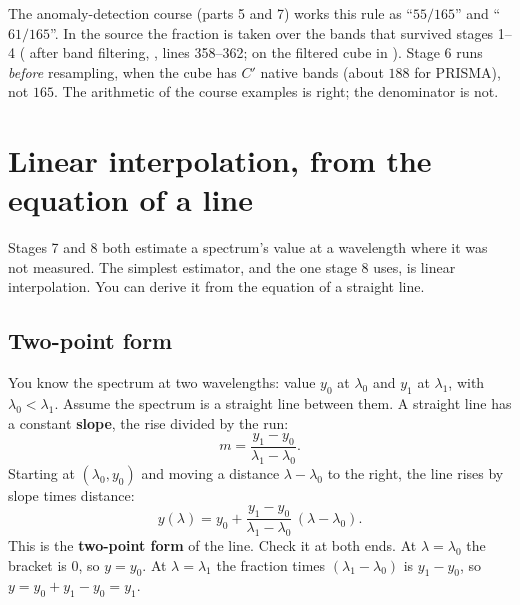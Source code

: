 \begin{sourcenote}
The anomaly-detection course (parts 5 and 7) works this rule as ``$55/165$'' and ``$61/165$''. In the
source the fraction is taken over the bands that survived stages 1--4 ( after band filtering, , lines 358--362;
 on the filtered cube in ). Stage 6 runs
\emph{before} resampling, when the cube has $C'$ native bands (about $188$ for PRISMA), not $165$.
The arithmetic of the course examples is right; the denominator is not.
\end{sourcenote}

\section{Linear interpolation, from the equation of a line}\label{sec:bandpipeline:linear}

Stages 7 and 8 both estimate a spectrum's value at a wavelength where it was not measured. The
simplest estimator, and the one stage 8 uses, is linear interpolation. You can derive it from the
equation of a straight line.

\subsection{Two-point form}

You know the spectrum at two wavelengths: value $y_0$ at $\lambda_0$ and $y_1$ at $\lambda_1$, with
$\lambda_0 < \lambda_1$. Assume the spectrum is a straight line between them. A straight line has a
constant \textbf{slope}, the rise divided by the run:
\begin{equation}\label{eq:bandpipeline:slope}
m = \frac{y_1 - y_0}{\lambda_1 - \lambda_0}.
\end{equation}
Starting at $(\lambda_0, y_0)$ and moving a distance $\lambda - \lambda_0$ to the right, the line
rises by slope times distance:
\begin{equation}\label{eq:bandpipeline:twopoint}
y(\lambda) = y_0 + \frac{y_1 - y_0}{\lambda_1 - \lambda_0}\,(\lambda - \lambda_0).
\end{equation}
This is the \textbf{two-point form} of the line. Check
it at both ends. At $\lambda = \lambda_0$ the bracket is $0$, so $y = y_0$. At
$\lambda = \lambda_1$ the fraction times $(\lambda_1 - \lambda_0)$ is $y_1 - y_0$, so
$y = y_0 + y_1 - y_0 = y_1$.


